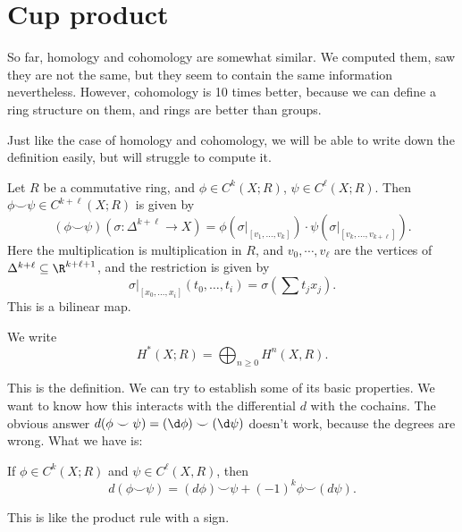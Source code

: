 \documentclass[a4paper]{article}
\begin{document}
\section{Cup product}
So far, homology and cohomology are somewhat similar. We computed them, saw they are not the same, but they seem to contain the same information nevertheless. However, cohomology is 10 times better, because we can define a ring structure on them, and rings are better than groups.

Just like the case of homology and cohomology, we will be able to write down the definition easily, but will struggle to compute it.

\begin{defi}\index{$\smile$}
  Let $R$ be a commutative ring, and $\phi \in C^k(X; R)$, $\psi \in C^\ell(X; R)$. Then $\phi \smile \psi \in C^{k + \ell}(X; R)$ is given by
  \[
    (\phi \smile \psi)(\sigma: \Delta^{k + \ell} \to X) = \phi(\sigma|_{[v_1, \ldots, v_k]}) \cdot \psi(\sigma|_{[v_k, \ldots, v_{k + \ell}]}).
  \]
  Here the multiplication is multiplication in $R$, and $v_0, \cdots, v_\ell$ are the vertices of $\Delta^{k + \ell} \subseteq \R^{k + \ell + 1}$, and the restriction is given by
  \[
    \sigma|_{[x_0, \ldots, x_i]} (t_0, \ldots, t_i) = \sigma\left(\sum t_j x_j\right).
  \]
  This is a bilinear map.
\end{defi}

\begin{notation}
  We write
  \[
    H^*(X; R) = \bigoplus_{n \geq 0} H^n(X, R).
  \]
\end{notation}
This is the definition. We can try to establish some of its basic properties. We want to know how this interacts with the differential $d$ with the cochains. The obvious answer $d(\phi \smile \psi) = (\d \phi) \smile (\d \psi)$ doesn't work, because the degrees are wrong. What we have is:

\begin{lemma}
  If $\phi \in C^k(X; R)$ and $\psi \in C^\ell(X, R)$, then
  \[
    d (\phi \smile \psi) = (d \phi)\smile \psi + (-1)^k \phi\smile(d \psi).
  \]
\end{lemma}
This is like the product rule with a sign.
\end{document}
